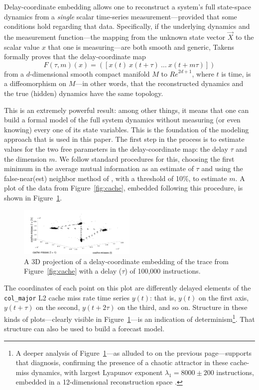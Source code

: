 \documentclass{article}
\begin{document}

Delay-coordinate embedding allows one to reconstruct a system's full
state-space dynamics from a \emph{single} scalar time-series
measurement---provided that some conditions hold regarding that data.
Specifically, if the underlying dynamics and the measurement
function---the mapping from the unknown state vector $\vec{X}$ to the
scalar value $x$ that one is measuring---are both smooth and generic,
Takens~\cite{takens} formally proves that the delay-coordinate map
\[
F(\tau,m)(x) = ([x(t) ~ x(t+\tau) ~ \dots ~x(t+m\tau)])
\]
from a $d$-dimensional smooth compact manifold $M$ to ${Re}^{2d+1}$,
where $t$ is time, is a diffeomorphism on $M$---in other words, that
the reconstructed dynamics and the true (hidden) dynamics have the
same topology.

This is an extremely powerful result: among other things, it means
that one can build a formal model of the full system dynamics without
measuring (or even knowing) every one of its state variables.  This is
the foundation of the modeling approach that is used in this paper.
The first step in the process is to estimate values for the two free
parameters in the delay-coordinate map: the delay $\tau$ and the
dimension $m$.  We follow standard procedures for this, choosing the
first minimum in the average mutual information as an estimate of
$\tau$ \cite{fraser-swinney} and using the false-near(est) neighbor
method of \cite{KBA92}, with a threshold of 10\%, to estimate $m$.  A
plot of the data from Figure~\ref{fig:cache}, embedded following this
procedure, is shown in Figure~\ref{fig:embedding}.
\begin{figure}
  \centering
    \includegraphics[width=0.5\textwidth]{figs/3dcolcache}
    \caption{A 3D projection of a delay-coordinate embedding of the trace
from Figure~\ref{fig:cache} with a delay ($\tau$) of 100,000 instructions.
}
\label{fig:embedding}
\end{figure}
The coordinates of each point on this plot are differently delayed
elements of the \verb|col_major| L2 cache miss rate time series
$y(t)$: that is, $y(t)$ on the first axis, $y(t+\tau)$ on the second,
$y(t+2\tau)$ on the third, and so on.
Structure in these kinds of plots---clearly visible in
Figure~\ref{fig:embedding}---is an indication of
determinism\footnote{A deeper analysis of
  Figure~\ref{fig:embedding}---as alluded to on the previous
  page---supports that diagnosis, confirming the presence of a chaotic
  attractor in these cache-miss dynamics, with largest Lyapunov
  exponent $\lambda_1 = 8000 \pm 200$ instructions, embedded in a
  12-dimensional reconstruction space \cite{mytkowicz09}.}.  That
structure can also be used to build a forecast model.
\end{document}
